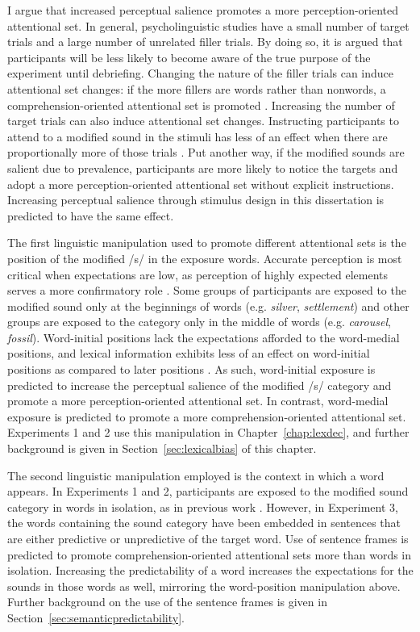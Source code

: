 I argue that increased perceptual salience promotes a more perception-oriented attentional set.
In general, psycholinguistic studies have a small number of target trials and a large number of unrelated filler trials.
By doing so, it is argued that participants will be less likely to become aware of the true purpose of the experiment until debriefing.
Changing the nature of the filler trials can induce attentional set changes: if the more fillers are words rather than nonwords, a comprehension-oriented attentional set is promoted \citep{Mirman2008}.
Increasing the number of target trials can also induce attentional set changes.
Instructing participants to attend to a modified sound in the stimuli has less of an effect when there are proportionally more of those trials \citep{Pitt2012}.
Put another way, if the modified sounds are salient due to prevalence, participants are more likely to notice the targets and adopt a more perception-oriented attentional set without explicit instructions.
Increasing perceptual salience through stimulus design in this dissertation is predicted to have the same effect.

The first linguistic manipulation used to promote different attentional sets is the position of the modified /s/ in the exposure words.  
Accurate perception is most critical when expectations are low, as perception of highly expected elements serves a more confirmatory role \citep{Marslen-Wilson1978, Gow1995}.
Some groups of participants are exposed to the modified sound only at the beginnings of words (e.g. \emph{silver}, \emph{settlement}) and other groups are exposed to the category only in the middle of words (e.g. \emph{carousel}, \emph{fossil}).
Word-initial positions lack the expectations afforded to the word-medial positions, and lexical information exhibits less of an effect on word-initial positions as compared to later positions \citep{Pitt2006}.
As such, word-initial exposure is predicted to increase the perceptual salience of the modified /s/ category and promote a more perception-oriented attentional set.
In contrast, word-medial exposure is predicted to promote a more comprehension-oriented attentional set.
Experiments 1 and 2 use this manipulation in Chapter~\ref{chap:lexdec}, and further background is given in Section~\ref{sec:lexicalbias} of this chapter.

The second linguistic manipulation employed is the context in which a word appears.  
In Experiments 1 and 2, participants are exposed to the modified sound category in words in isolation, as in previous work \citep{Norris2003}.  
However, in Experiment 3, the words containing the sound category have been embedded in sentences that are either predictive or unpredictive of the target word.
Use of sentence frames is predicted to promote comprehension-oriented attentional sets more than words in isolation.
Increasing the predictability of a word increases the expectations for the sounds in those words as well, mirroring the word-position manipulation above.
Further background on the use of the sentence frames is given in Section~\ref{sec:semanticpredictability}.

